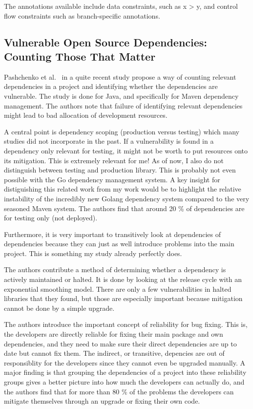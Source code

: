 The annotations available include data constraints, such as x > y, and control flow constraints such as branch-specific
annotations.



\subsection{Vulnerable Open Source Dependencies: Counting Those That Matter}
\label{subsec:vulnerable-open-source-dependencies:-counting-those-that-matter}

Pashchenko et al.~\cite{pashchenko2018} in a quite recent study propose a way of counting relevant dependencies in a
project and identifying whether the dependencies are vulnerable.
The study is done for Java, and specifically for Maven dependency management.
The authors note that failure of identifying relevant dependencies might lead to bad allocation of development resources.

A central point is dependency scoping (production versus testing) which many studies did not incorporate in the past.
If a vulnerability is found in a dependency only relevant for testing, it might not be worth to put resources onto its
mitigation.
This is extremely relevant for me!
As of now, I also do not distinguish between testing and production library.
This is probably not even possible with the Go dependency management system.
A key insight for distiguishing this related work from my work would be to highlight the relative instability of the
incredibly new Golang dependency system compared to the very seasoned Maven system.
The authors find that around 20 \% of dependencies are for testing only (not deployed).

Furthermore, it is very important to transitively look at dependencies of dependencies because they can just as well
introduce problems into the main project.
This is something my study already perfectly does.

The authors contribute a method of determining whether a dependency is actively maintained or halted.
It is done by looking at the release cycle with an exponential smoothing model.
There are only a few vulnerabilities in halted libraries that they found, but those are especially important because
mitigation cannot be done by a simple upgrade.

The authors introduce the important concept of reliability for bug fixing.
This is, the developers are directly reliable for fixing their main package and own dependencies, and they need to
make sure their direct dependencies are up to date but cannot fix them.
The indirect, or transitive, depencies are out of responsiblity for the developers since they cannot even be upgraded
manually.
A major finding is that grouping the dependencies of a project into these reliability groups gives a better picture into
how much the developers can actually do, and the authors find that for more than 80 \% of the problems the developers
can mitigate themselves through an upgrade or fixing their own code.

